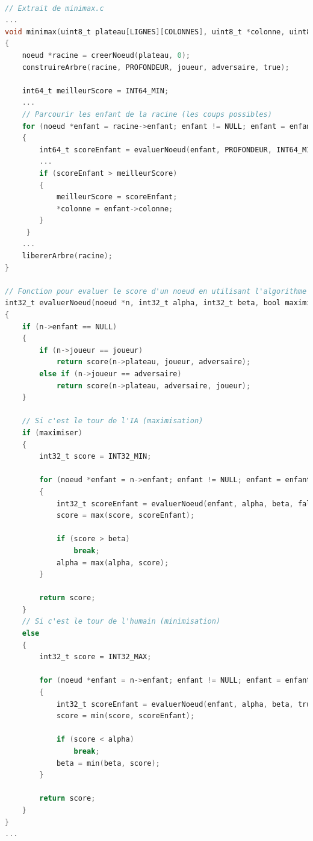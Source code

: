 \documentclass[a4paper,fleqn]{article}
\begin{document}
\begin{lstlisting}[language=C, caption=Minimax utilisé avec élagage en C]

// Extrait de minimax.c
...
void minimax(uint8_t plateau[LIGNES][COLONNES], uint8_t *colonne, uint8_t joueur, uint8_t adversaire)
{
    noeud *racine = creerNoeud(plateau, 0);
    construireArbre(racine, PROFONDEUR, joueur, adversaire, true);

    int64_t meilleurScore = INT64_MIN;
    ...
    // Parcourir les enfant de la racine (les coups possibles)
    for (noeud *enfant = racine->enfant; enfant != NULL; enfant = enfant->suivant)
    {
        int64_t scoreEnfant = evaluerNoeud(enfant, PROFONDEUR, INT64_MIN, INT64_MAX, false, joueur, adversaire);
        ...
        if (scoreEnfant > meilleurScore)
        {
            meilleurScore = scoreEnfant;
            *colonne = enfant->colonne;
        }
     }
    ...
    libererArbre(racine);
}

// Fonction pour evaluer le score d'un noeud en utilisant l'algorithme minimax avec elagage alphabeta
int32_t evaluerNoeud(noeud *n, int32_t alpha, int32_t beta, bool maximiser, uint8_t joueur, uint8_t adversaire)
{
    if (n->enfant == NULL)
    {
        if (n->joueur == joueur)
            return score(n->plateau, joueur, adversaire);
        else if (n->joueur == adversaire)
            return score(n->plateau, adversaire, joueur);
    }

    // Si c'est le tour de l'IA (maximisation)
    if (maximiser)
    {
        int32_t score = INT32_MIN;

        for (noeud *enfant = n->enfant; enfant != NULL; enfant = enfant->suivant)
        {
            int32_t scoreEnfant = evaluerNoeud(enfant, alpha, beta, false, joueur, adversaire);
            score = max(score, scoreEnfant);

            if (score > beta)
                break;
            alpha = max(alpha, score);
        }

        return score;
    }
    // Si c'est le tour de l'humain (minimisation)
    else
    {
        int32_t score = INT32_MAX;

        for (noeud *enfant = n->enfant; enfant != NULL; enfant = enfant->suivant)
        {
            int32_t scoreEnfant = evaluerNoeud(enfant, alpha, beta, true, joueur, adversaire);
            score = min(score, scoreEnfant);

            if (score < alpha)
                break;
            beta = min(beta, score);
        }

        return score;
    }
}
...
\end{lstlisting}
\end{document}
